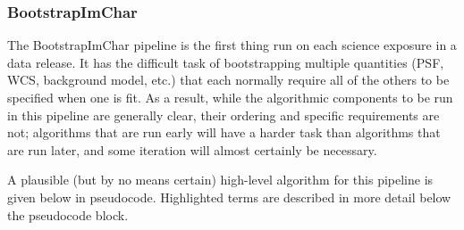 \subsubsection{BootstrapImChar}
\label{sec:drpBootstrapImChar}

The BootstrapImChar pipeline is the first thing run on each science exposure in a data release.  It has the difficult task of bootstrapping multiple quantities (PSF, WCS, background model, etc.) that each normally require all of the others to be specified when one is fit.  As a result, while the algorithmic components to be run in this pipeline are generally clear, their ordering and specific requirements are not; algorithms that are run early will have a harder task than algorithms that are run later, and some iteration will almost certainly be necessary.

A plausible (but by no means certain) high-level algorithm for this pipeline is given below in pseudocode.  Highlighted terms are described in more detail below the pseudocode block.


\newcommand{\hr}[1]{\hyperref[sec:drpBootstrapImChar_#1]{#1}}

